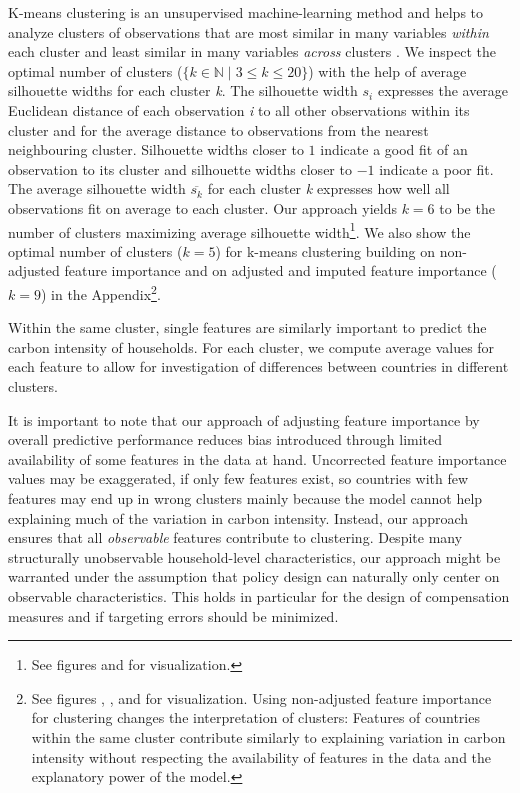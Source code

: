 \documentclass[12pt, a4paper]{article}
\begin{document}
K-means clustering is an unsupervised machine-learning method and helps to analyze clusters of observations that are most similar in many variables \textit{within} each cluster and least similar in many variables \textit{across} clusters \autocite{MacQueen.1967}. We inspect the optimal number of clusters ($\{k \in \mathbb{N} \mid 3  \leq k \leq 20 \}$) with the help of average silhouette widths \autocite{Rousseeuw.1987} for each cluster \textit{k}. The silhouette width $s_{i}$ expresses the average Euclidean distance of each observation \textit{i} to all other observations within its cluster and for the average distance to observations from the nearest neighbouring cluster. Silhouette widths closer to $1$ indicate a good fit of an observation to its cluster and silhouette widths closer to $-1$ indicate a poor fit. The average silhouette width $\overline{s_{k}}$ for each cluster \textit{k} expresses how well all observations fit on average to each cluster. Our approach yields $k = 6$ to be the number of clusters maximizing average silhouette width\footnote{See figures  and  for visualization.}. We also show the optimal number of clusters ($k = 5$) for k-means clustering building on non-adjusted feature importance and on adjusted and imputed feature importance ($k=9$) in the Appendix\footnote{See figures , ,  and  for visualization. Using non-adjusted feature importance for clustering changes the interpretation of clusters: Features of countries within the same cluster contribute similarly to explaining variation in carbon intensity without respecting the availability of features in the data and the explanatory power of the model.}.

Within the same cluster, single features are similarly important to predict the carbon intensity of households. For each cluster, we compute average values for each feature to allow for investigation of differences between countries in different clusters.%

It is important to note that our approach of adjusting feature importance by overall predictive performance reduces bias introduced through limited availability of some features in the data at hand. Uncorrected feature importance values may be exaggerated, if only few features exist, so countries with few features may end up in wrong clusters mainly because the model cannot help explaining much of the variation in carbon intensity. Instead, our approach ensures that all \textit{observable} features contribute to clustering. Despite many structurally unobservable household-level characteristics, our approach might be warranted under the assumption that policy design can naturally only center on observable characteristics. This holds in particular for the design of compensation measures and if targeting errors should be minimized.
\end{document}

